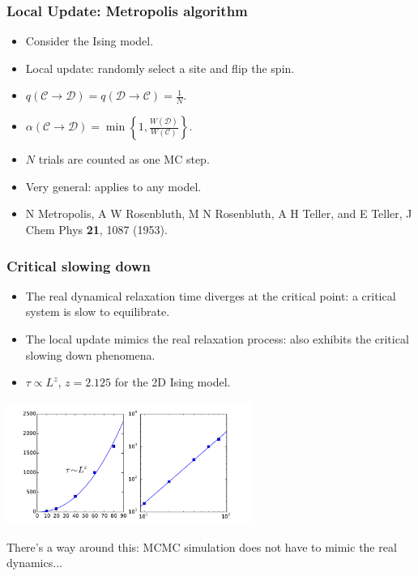 \documentclass[xcolor=table, 10pt, aspectratio=169, ignorenonframetext]{beamer}
\begin{document}
\begin{frame}
  \frametitle{Local Update: Metropolis algorithm}
  \begin{center}
  \end{center}
  \begin{itemize}
    \item Consider the Ising model.
    \item Local update: randomly select a site and flip the spin.
    \item $q(\mathcal C\rightarrow\mathcal D) = q(\mathcal D\rightarrow\mathcal C) = \frac1N$.
    \item $\alpha(\mathcal C\rightarrow\mathcal D)=\min\left\{1,\frac{W(\mathcal D)}{W(\mathcal C)}\right\}.$
    \item $N$ trials are counted as one MC step.
    \item Very general: applies to any model.
    \item N Metropolis, A W Rosenbluth, M N Rosenbluth, A H Teller, and E Teller, J Chem Phys \textbf{21}, 1087 (1953).
  \end{itemize}
\end{frame}

\begin{frame}
  \frametitle{Critical slowing down}
  \begin{itemize}
    \item The real dynamical relaxation time diverges at the critical point: a critical system is slow to equilibrate.
    \item The local update mimics the real relaxation process: also exhibits the critical slowing down phenomena.
    \item $\tau\propto L^z$, $z=2.125$ for the 2D Ising model.
  \end{itemize}
  \begin{center}
    \includegraphics[width=8cm]{../slmctut/slowdown}
  \end{center}
  There's a way around this: MCMC simulation does not have to mimic the real dynamics...
\end{frame}
\end{document}
